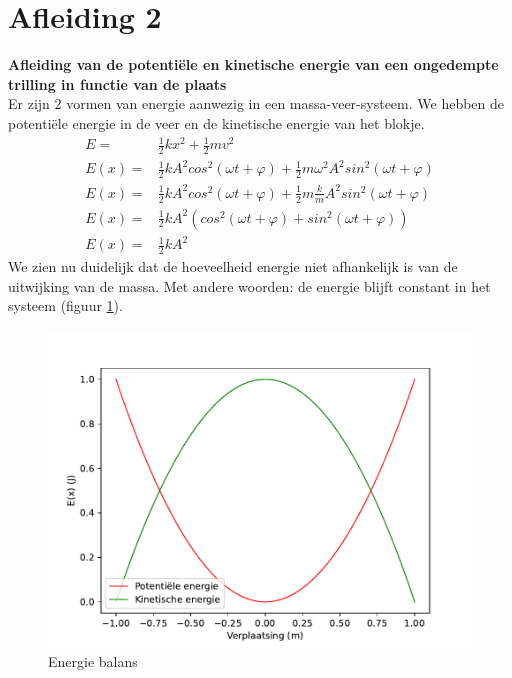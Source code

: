 \documentclass[a4paper,kul]{kulakarticle} %
\begin{document}
\newpage
\section{Afleiding 2}
\textbf{Afleiding van de potentiële en kinetische energie van een ongedempte trilling in functie van de plaats}
\\

Er zijn 2 vormen van energie aanwezig in een massa-veer-systeem. We hebben de potentiële energie in de veer en de kinetische energie van het blokje.
\begin{align*}
	E = & \frac{1}{2}kx^2 + \frac{1}{2}mv^2\\
	E(x) = & \frac{1}{2}k A^2cos^2(\omega t +\varphi) + \frac{1}{2}m \omega^2 A^2 sin^2(\omega t + \varphi)\\
	E(x) = & \frac{1}{2}k A^2cos^2(\omega t +\varphi) + \frac{1}{2}m \frac{k}{m} A^2 sin^2(\omega t + \varphi)\\
	E(x) = & \frac{1}{2} k A^2 (cos^2(\omega t +\varphi) + sin^2(\omega t + \varphi))\\
	E(x) = & \frac{1}{2} k A^2
\end{align*} 
We zien nu duidelijk dat de hoeveelheid energie niet afhankelijk is van de uitwijking van de massa. Met andere woorden: de energie blijft constant in het systeem (figuur \ref{fig:energiebalans}).
\begin{figure}[htbp]
	\centering
	\includegraphics[width=0.7\linewidth]{Energie_Balans}
	\caption[Energie balans]{Energie balans}
	\label{fig:energiebalans}
\end{figure}

\newpage
\end{document}
